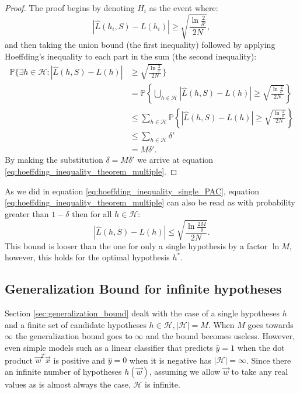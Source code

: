 \begin{proof}
  The proof begins by denoting $H_i$ as the event where: 
  \begin{equation*}
    \left| \hat{L}(h_i, S) - L(h_i) \right| \geq \sqrt{\frac{\ln \frac{2}{\delta'}}{2N}},
  \end{equation*}
   and then taking the union bound (the first inequality) followed by applying Hoeffding's inequality to each part in the sum (the second inequality): 
\begin{equation*}
  \begin{split}
    \mathbb{P} \Biggl\{ \exists h \in \mathcal{H}: \left| \hat{L}(h, S) - L(h) \right| &\geq \sqrt{\frac{\ln \frac{2}{\delta'}}{2N}}  \Biggr\} \\
    &= \mathbb{P} \left\{ \bigcup_{h \in \mathcal{H}} \left| \hat{L}(h, S) - L(h) \right| \geq \sqrt{\frac{\ln \frac{2}{\delta'}}{2N}}  \right\}  \\
    &\leq \sum_{h \in \mathcal{H}} \mathbb{P} \left\{\left| \hat{L}(h, S) - L(h) \right| \geq \sqrt{\frac{\ln \frac{2}{\delta'}}{2N}} \right\}  \\
    &\leq \sum_{h \in \mathcal{H}} \delta' \\
    &= M \delta'.
  \end{split}
\end{equation*}
By making the substitution $\delta = M \delta'$ we arrive at equation \eqref{eq:hoeffding_inequality_theorem_multiple}. 
\end{proof}

As we did in equation \eqref{eq:hoeffding_inequality_single_PAC}, equation \eqref{eq:hoeffding_inequality_theorem_multiple} can also be read as with probability greater than $1-\delta$ then for all $h\in\mathcal{H}$:
\begin{equation}
  \label{eq:hoeffding_inequality_multi_PAC}
  \left| \hat{L}(h, S) - L(h) \right| \leq \sqrt{\frac{\ln \frac{2M}{\delta}}{2N}}.
\end{equation}
This bound is looser than the one for only a single hypothesis by a factor $\ln M$, however, this holds for the optimal hypothesis $h^*$. 

\subsection{Generalization Bound for infinite hypotheses}
\label{subsec:generalization_bound_infinite}
Section \ref{sec:generalization_bound} dealt with the case of a single hypotheses $h$ and a finite set of candidate hypotheses $h\in\mathcal{H}, |\mathcal{H}| = M$. When $M$ goes towards $\infty$ the generalization bound goes to $\infty$ and the bound becomes useless. However, even simple models such as a linear classifier that predicts $\hat{y}=1$ when the dot product $\vec{w}^T\vec{x}$ is positive and $\hat{y}=0$ when it is negative has $|\mathcal{H}| = \infty$. Since there an infinite number of hypotheses $h(\vec{w})$, assuming we allow $\vec{w}$ to take any real values as is almost always the case, $\mathcal{H}$ is infinite. 

